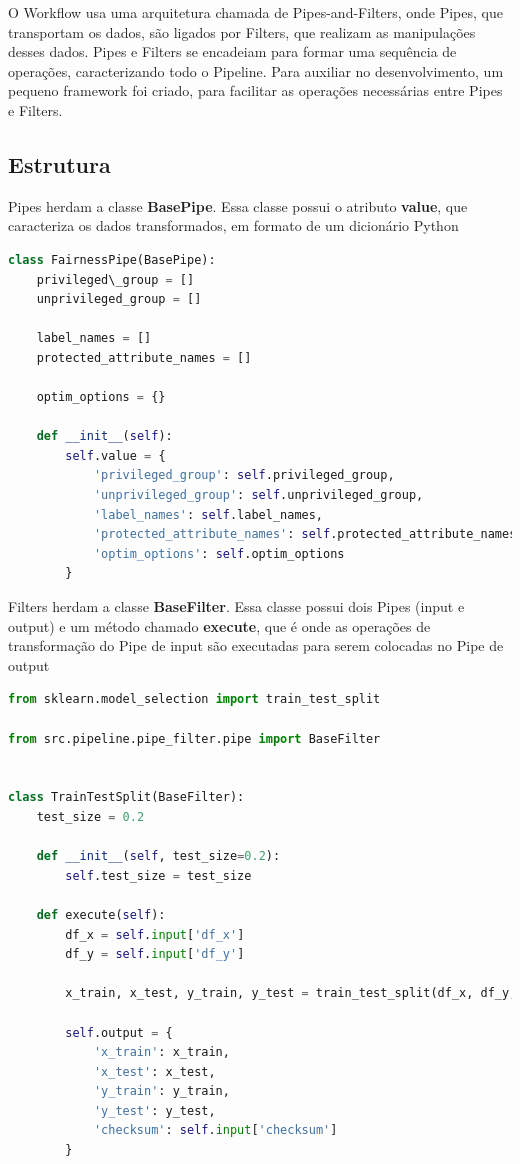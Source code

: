 \documentclass[portugues]{ic-tese}
\begin{document}
O Workflow usa uma arquitetura chamada de Pipes-and-Filters, onde Pipes, que transportam os dados, são ligados por Filters, que realizam as manipulações desses dados. Pipes e Filters se encadeiam para formar uma sequência de operações, caracterizando todo o Pipeline. Para auxiliar no desenvolvimento, um pequeno framework foi criado, para facilitar as operações necessárias entre Pipes e Filters. 

\subsection{Estrutura}

Pipes herdam a classe \textbf{BasePipe}. Essa classe possui o atributo \textbf{value}, que caracteriza os dados transformados, em formato de um dicionário Python

\begin{lstlisting}[language=Python, label=cod:FairnessPipeClass]
class FairnessPipe(BasePipe):
    privileged\_group = []
    unprivileged_group = []

    label_names = []
    protected_attribute_names = []

    optim_options = {}

    def __init__(self):
        self.value = {
            'privileged_group': self.privileged_group,
            'unprivileged_group': self.unprivileged_group,
            'label_names': self.label_names,
            'protected_attribute_names': self.protected_attribute_names,
            'optim_options': self.optim_options
        }
\end{lstlisting}

Filters herdam a classe \textbf{BaseFilter}. Essa classe possui dois Pipes (input e output) e um método chamado \textbf{execute}, que é onde as operações de transformação do Pipe de input são executadas para serem colocadas no Pipe de output

\begin{lstlisting}[language=Python, label=cod:TrainTestSplitClass]
from sklearn.model_selection import train_test_split

from src.pipeline.pipe_filter.pipe import BaseFilter


class TrainTestSplit(BaseFilter):
    test_size = 0.2

    def __init__(self, test_size=0.2):
        self.test_size = test_size

    def execute(self):
        df_x = self.input['df_x']
        df_y = self.input['df_y']

        x_train, x_test, y_train, y_test = train_test_split(df_x, df_y, test_size=self.test_size, random_state=42)

        self.output = {
            'x_train': x_train,
            'x_test': x_test,
            'y_train': y_train,
            'y_test': y_test,
            'checksum': self.input['checksum']
        }
\end{lstlisting}
\end{document}
